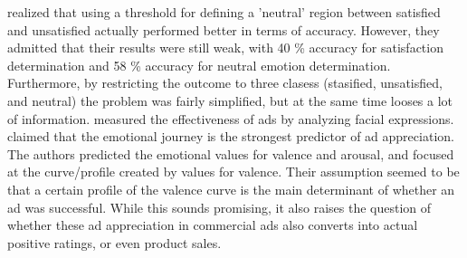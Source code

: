 \citet{Kamaruddin:2016:MeasuringCustomerSatisfaction} realized that using a threshold for defining a 'neutral' region between satisfied and unsatisfied actually performed better in terms of accuracy. However, they admitted that their results were still weak, with 40 \% accuracy for satisfaction determination and 58 \% accuracy for neutral emotion determination. Furthermore, by restricting the outcome to three clasess (stasified, unsatisfied, and neutral) the problem was fairly simplified, but at the same time looses a lot of information.
\newline\newline
\citet{Poirier:2016:AdsFacialExpression} measured the effectiveness of ads by analyzing facial expressions. \citet{Poirier:2016:AdsFacialExpression} claimed that the emotional journey is the strongest predictor of ad appreciation. The authors predicted the emotional values for valence and arousal, and focused at the curve/profile created by values for valence. Their assumption seemed to be that a certain profile of the valence curve is the main determinant of whether an ad was successful. While this sounds promising, it also raises the question of whether these ad appreciation in commercial ads also converts into actual positive ratings, or even product sales.
